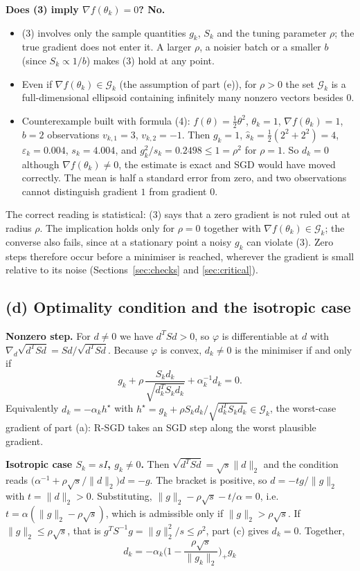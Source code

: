 \documentclass[11pt,a4paper]{article}
\newcommand{\G}{\mathcal{G}_k}
\newcommand{\norm}[1]{\lVert #1\rVert_2}
\begin{document}
\textbf{Does (3) imply $\nabla f(\theta_k)=0$? No.}
\begin{itemize}
\item (3) involves only the sample quantities $g_k$, $S_k$ and the tuning parameter $\rho$; the
true gradient does not enter it. A larger $\rho$, a noisier batch or a smaller $b$ (since
$S_k\propto1/b$) makes (3) hold at any point.
\item Even if $\nabla f(\theta_k)\in\G$ (the assumption of part (e)), for $\rho>0$ the set $\G$
is a full-dimensional ellipsoid containing infinitely many nonzero vectors besides $0$.
\item Counterexample built with formula (4): $f(\theta)=\tfrac12\theta^2$, $\theta_k=1$,
$\nabla f(\theta_k)=1$, $b=2$ observations $v_{k,1}=3$, $v_{k,2}=-1$. Then $g_k=1$,
$\widehat s_k=\tfrac12(2^2+2^2)=4$, $\varepsilon_k=0.004$, $s_k=4.004$, and
$g_k^2/s_k=0.2498\le1=\rho^2$ for $\rho=1$. So $d_k=0$ although $\nabla f(\theta_k)\ne0$, the
estimate is exact and SGD would have moved correctly. The mean is half a standard error from
zero, and two observations cannot distinguish gradient $1$ from gradient $0$.
\end{itemize}
The correct reading is statistical: (3) says that a zero gradient is not ruled out at radius
$\rho$. The implication holds only for $\rho=0$ together with $\nabla f(\theta_k)\in\G$; the
converse also fails, since at a stationary point a noisy $g_k$ can violate (3). Zero steps
therefore occur before a minimiser is reached, wherever the gradient is small relative to its
noise (Sections~\ref{sec:checks} and \ref{sec:critical}).

\subsection{(d) Optimality condition and the isotropic case}

\textbf{Nonzero step.} For $d\ne0$ we have $d^TSd>0$, so $\varphi$ is differentiable at $d$
with $\nabla_d\sqrt{d^TSd}=Sd/\sqrt{d^TSd}$. Because $\varphi$ is convex, $d_k\ne0$ is the
minimiser if and only if
\begin{equation*}
g_k+\rho\,\frac{S_kd_k}{\sqrt{d_k^TS_kd_k}}+\alpha_k^{-1}d_k=0 .
\end{equation*}
Equivalently $d_k=-\alpha_kh^\star$ with $h^\star=g_k+\rho S_kd_k/\sqrt{d_k^TS_kd_k}\in\G$, the
worst-case gradient of part (a): R-SGD takes an SGD step along the worst plausible gradient.

\textbf{Isotropic case $S_k=sI$, $g_k\ne0$.} Then $\sqrt{d^TSd}=\sqrt s\norm d$ and the condition
reads $\big(\alpha^{-1}+\rho\sqrt s/\norm d\big)d=-g$. The bracket is positive, so $d=-tg/\norm g$
with $t=\norm d>0$. Substituting, $\norm g-\rho\sqrt s-t/\alpha=0$, i.e.\
$t=\alpha(\norm g-\rho\sqrt s)$, which is admissible only if $\norm g>\rho\sqrt s$. If
$\norm g\le\rho\sqrt s$, that is $g^TS^{-1}g=\norm g^2/s\le\rho^2$, part (c) gives $d_k=0$.
Together,
\begin{equation*}
\boxed{\;d_k=-\alpha_k\Big(1-\frac{\rho\sqrt s}{\norm{g_k}}\Big)_+g_k\;}
\end{equation*}
\end{document}
